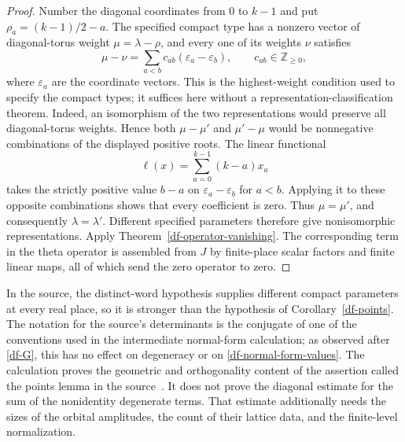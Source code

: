 \begin{proof}
Number the diagonal coordinates from $0$ to $k-1$ and put
$\rho_a=(k-1)/2-a$.  The specified compact type has a nonzero
vector of diagonal-torus weight $\mu=\lambda-\rho$, and every
one of its weights $\nu$ satisfies
\[
 \mu-\nu=\sum_{a<b}c_{ab}(\varepsilon_a-\varepsilon_b),
 \qquad c_{ab}\in\mathbb Z_{\ge0},
\]
where $\varepsilon_a$ are the coordinate vectors.  This is the
highest-weight condition used to specify the compact types;
it suffices here without a representation-classification theorem.
Indeed, an isomorphism of the two representations would preserve
all diagonal-torus weights.  Hence both $\mu-\mu'$ and
$\mu'-\mu$ would be nonnegative combinations of the displayed
positive roots.  The linear functional
\[
             \ell(x)=\sum_{a=0}^{k-1}(k-a)x_a
\]
takes the strictly positive value $b-a$ on
$\varepsilon_a-\varepsilon_b$ for $a<b$.  Applying it to
these opposite combinations shows that every coefficient is
zero.  Thus $\mu=\mu'$, and consequently $\lambda=\lambda'$.
Different specified parameters therefore give nonisomorphic
representations.  Apply
Theorem~\ref{df-operator-vanishing}.  The corresponding term in
the theta operator is assembled from $J$ by finite-place scalar
factors and finite linear maps, all of which send the zero operator
to zero.
\end{proof}

In the source, the distinct-word hypothesis supplies different
compact parameters at every real place, so it is stronger than
the hypothesis of Corollary~\ref{df-points}.  The notation for the
source's determinants is the conjugate of one of the conventions
used in the intermediate normal-form calculation; as observed
after \eqref{df-G}, this has no effect on degeneracy or on
\eqref{df-normal-form-values}.  The calculation proves the
geometric and orthogonality content of the assertion called the
points lemma in the source~\cite{alpo-uniform-source}.
It does not prove the diagonal estimate for the sum of the
nonidentity degenerate terms.  That estimate additionally needs
the sizes of the orbital amplitudes, the count of their lattice
data, and the finite-level normalization.


